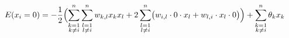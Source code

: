 \documentclass{article}
\begin{document}
\begin{equation*}
  E(x_i=0)
  =-\frac12\Bigl(
     \sum_{\substack{k=1\\k\neq i}}^n\sum_{\substack{l=1\\l\neq i}}^n w_{k,l}x_kx_l
   +2\sum_{\substack{l=1\\l\neq i}}^n\bigl(w_{i,l}\cdot0\cdot x_l + w_{l,i}\cdot x_l\cdot0\bigr)
  \Bigr)
   +\sum_{\substack{k=1\\k\neq i}}^n\theta_kx_k
\end{equation*}
\end{document}

